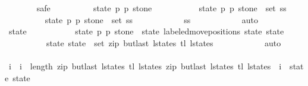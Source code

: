 \begin{isabellebody}
\ \ \ \ \ \ \isamarkupfalse%
\ safe\isanewline
\ \ \ \ \ \ \ \ \isamarkupfalse%
\ state\ p{}\ p{}\ stone{\isacharprime}\ \isanewline
\ \ \ \ \ \ \ \ \isamarkupfalse%
\ {\isachardoublequoteopen}{\isacharparenleft}state{\isacharcomma}\ p{}{\isacharcomma}\ p{}{\isacharcomma}\ stone{\isacharprime}{\isacharparenright}\ {\isasymin}\ set\ ss{\isachardoublequoteclose}\isanewline
\ \ \ \ \ \ \ \ \isamarkupfalse%
\ {\isachardoublequoteopen}{\isacharparenleft}state{\isacharcomma}\ p{}{\isacharcomma}\ p{}{\isacharcomma}\ stone{\isacharprime}{\isacharparenright}\ {\isasymin}\ set\ {\isacharquery}ss{\isachardoublequoteclose}\isanewline
\ \ \ \ \ \ \ \ \ \ \isamarkupfalse%
\ ss\isanewline
\ \ \ \ \ \ \ \ \ \ \isamarkupfalse%
\ auto\isanewline
\ \ \ \ \ \ \ \ \isamarkupfalse%
\ \isamarkupfalse%
\ state{\isacharprime}\ \isanewline
\ \ \ \ \ \ \ \ \ \ {\isachardoublequoteopen}{\isacharparenleft}state{\isacharcomma}\ p{}{\isacharcomma}\ p{}{\isacharcomma}\ stone{\isacharprime}{\isacharparenright}\ {\isacharequal}\ {\isacharparenleft}state{\isacharcomma}\ labeled{\isacharunderscore}move{\isacharunderscore}positions\ state\ state{\isacharprime}{\isacharparenright}{\isachardoublequoteclose}\isanewline
\ \ \ \ \ \ \ \ \ \ {\isachardoublequoteopen}{\isacharparenleft}state{\isacharcomma}\ state{\isacharprime}{\isacharparenright}\ {\isasymin}\ set\ {\isacharparenleft}zip\ {\isacharparenleft}butlast\ l{\isacharunderscore}states{\isacharparenright}\ {\isacharparenleft}tl\ l{\isacharunderscore}states{\isacharparenright}{\isacharparenright}{\isachardoublequoteclose}\isanewline
\ \ \ \ \ \ \ \ \ \ \isamarkupfalse%
\ auto\isanewline
\ \ \ \ \ \ \ \ \isamarkupfalse%
\ \isamarkupfalse%
\ i\ \ {\isachardoublequoteopen}i\ {\isacharless}\ length\ {\isacharparenleft}{\isacharparenleft}zip\ {\isacharparenleft}butlast\ l{\isacharunderscore}states{\isacharparenright}\ {\isacharparenleft}tl\ l{\isacharunderscore}states{\isacharparenright}{\isacharparenright}{\isacharparenright}{\isachardoublequoteclose}\ {\isachardoublequoteopen}{\isacharparenleft}zip\ {\isacharparenleft}butlast\ l{\isacharunderscore}states{\isacharparenright}\ {\isacharparenleft}tl\ l{\isacharunderscore}states{\isacharparenright}{\isacharparenright}\ {\isacharbang}\ i\ {\isacharequal}\ {\isacharparenleft}state{\isacharcomma}\ state{\isacharprime}{\isacharparenright}{\isachardoublequoteclose}\isanewline

\end{isabellebody}
